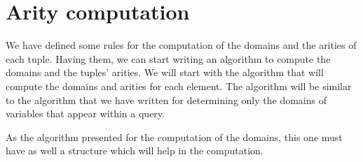 \documentclass[12pt]{article}
\begin{document}
\section{Arity computation}

We have defined some rules for the computation of the domains and the arities of each tuple. Having them, we can start writing an algorithm to compute the domains and the tuples' arities. We will start with the algorithm that will compute the domains and arities for each element. The algorithm will be similar to the algorithm that we have written for determining only the domains of variables that appear within a query.

As the algorithm presented for the computation of the domains, this one must have as well a structure which will help in the computation.
\end{document}
